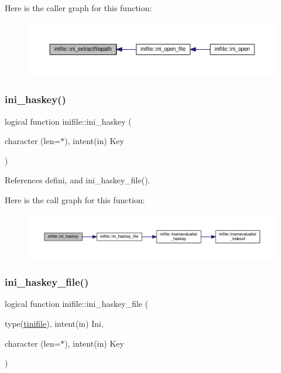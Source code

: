 Here is the caller graph for this function\+:
\nopagebreak
\begin{figure}[H]
\begin{center}
\leavevmode
\includegraphics[width=350pt]{namespaceinifile_a363a92da96b45fce841b0f4dfb2f3fd9_icgraph}
\end{center}
\end{figure}
\mbox{\label{namespaceinifile_a72c6fee616d03391492c7f2722f12ca8}} 
\subsubsection{\texorpdfstring{ini\+\_\+haskey()}{ini\_haskey()}}
{\footnotesize\ttfamily logical function inifile\+::ini\+\_\+haskey (\begin{DoxyParamCaption}\item[{character (len=$\ast$), intent(in)}]{Key }\end{DoxyParamCaption})}



References defini, and ini\+\_\+haskey\+\_\+file().

Here is the call graph for this function\+:
\nopagebreak
\begin{figure}[H]
\begin{center}
\leavevmode
\includegraphics[width=350pt]{namespaceinifile_a72c6fee616d03391492c7f2722f12ca8_cgraph}
\end{center}
\end{figure}
\mbox{\label{namespaceinifile_afa65465f4a06b9d51b12e74038f77132}} 
\subsubsection{\texorpdfstring{ini\+\_\+haskey\+\_\+file()}{ini\_haskey\_file()}}
{\footnotesize\ttfamily logical function inifile\+::ini\+\_\+haskey\+\_\+file (\begin{DoxyParamCaption}\item[{type(\mbox{\hyperlink{structinifile_1_1tinifile}{tinifile}}), intent(in)}]{Ini,  }\item[{character (len=$\ast$), intent(in)}]{Key }\end{DoxyParamCaption})}



